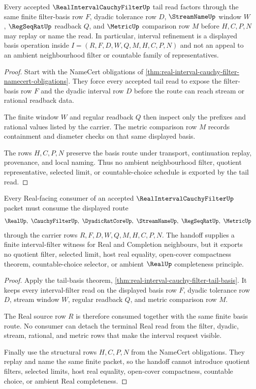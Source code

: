 \begin{theorem}
\label{thm:real-interval-cauchy-filter-tail-basis}
Every accepted $\RealIntervalCauchyFilterUp$ tail read factors through the same finite filter-basis row $F$, dyadic tolerance row $D$, $\StreamNameUp$ window $W$, $\RegSeqRatUp$ readback $Q$, and $\MetricUp$ comparison row $M$ before $H,C,P,N$ may replay or name the read. In particular, interval refinement is a displayed basis operation inside $I=(R,F,D,W,Q,M,H,C,P,N)$ and not an appeal to an ambient neighbourhood filter or countable family of representatives.
\end{theorem}
\begin{proof}
Start with the NameCert obligations of \autoref{thm:real-interval-cauchy-filter-namecert-obligations}. They force every accepted tail read to expose the filter-basis row $F$ and the dyadic interval row $D$ before the route can reach stream or rational readback data.

The finite window $W$ and regular readback $Q$ then inspect only the prefixes and rational values listed by the carrier. The metric comparison row $M$ records containment and diameter checks on that same displayed basis.

The rows $H,C,P,N$ preserve the basis route under transport, continuation replay, provenance, and local naming. Thus no ambient neighbourhood filter, quotient representative, selected limit, or countable-choice schedule is exported by the tail read.
\end{proof}

\begin{theorem}
\label{thm:real-interval-cauchy-filter-real-handoff}
Every Real-facing consumer of an accepted $\RealIntervalCauchyFilterUp$ packet must consume the displayed route
$$
\RealUp,\ \CauchyFilterUp,\ \DyadicRatCoreUp,\ \StreamNameUp,\ \RegSeqRatUp,\ \MetricUp
$$
through the carrier rows $R,F,D,W,Q,M,H,C,P,N$. The handoff supplies a finite interval-filter witness for Real and Completion neighbours, but it exports no quotient filter, selected limit, host real equality, open-cover compactness theorem, countable-choice selector, or ambient $\RealUp$ completeness principle.
\end{theorem}
\begin{proof}
Apply the tail-basis theorem, \autoref{thm:real-interval-cauchy-filter-tail-basis}. It keeps every interval-filter read on the displayed basis row $F$, dyadic tolerance row $D$, stream window $W$, regular readback $Q$, and metric comparison row $M$.

The Real source row $R$ is therefore consumed together with the same finite basis route. No consumer can detach the terminal Real read from the filter, dyadic, stream, rational, and metric rows that make the interval request visible.

Finally use the structural rows $H,C,P,N$ from the NameCert obligations. They replay and name the same finite packet, so the handoff cannot introduce quotient filters, selected limits, host real equality, open-cover compactness, countable choice, or ambient Real completeness.
\end{proof}


